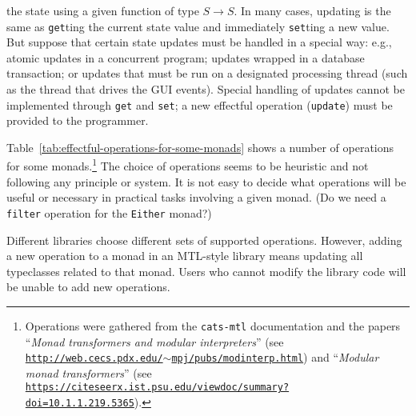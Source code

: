 \noindent the state using a given function of type $S\rightarrow S$.
In many cases, updating is the same as \lstinline!get!ting the current
state value and immediately \lstinline!set!ting a new value. But
suppose that certain state updates must be handled in a special way:
e.g., atomic updates in a concurrent program; updates wrapped in a
database transaction; or updates that must be run on a designated
processing thread (such as the thread that drives the GUI events).
Special handling of updates cannot be implemented through \lstinline!get!
and \lstinline!set!; a new effectful operation (\lstinline!update!)
must be provided to the programmer.

Table~\ref{tab:effectful-operations-for-some-monads} shows a number
of operations for some monads.\footnote{Operations were gathered from the \texttt{cats-mtl} documentation
and the papers \textsf{``}\emph{Monad transformers and modular interpreters}\textsf{''}
(see \texttt{\href{http://web.cecs.pdx.edu/~mpj/pubs/modinterp.html}{http://web.cecs.pdx.edu/$\sim$mpj/pubs/modinterp.html}})
and \textsf{``}\emph{Modular monad transformers}\textsf{''} (see \texttt{\href{https://citeseerx.ist.psu.edu/viewdoc/summary?doi=10.1.1.219.5365}{https://citeseerx.ist.psu.edu/viewdoc/summary?doi=10.1.1.219.5365}}).} The choice of operations seems to be heuristic and not following
any principle or system. It is not easy to decide what operations
will be useful or necessary in practical tasks involving a given monad.
(Do we need a \lstinline!filter! operation for the \lstinline!Either!
monad?) 

Different libraries choose different sets of supported operations.
However, adding a new operation to a monad in an MTL-style library
means updating all typeclasses related to that monad. Users who cannot
modify the library code will be unable to add new operations.


